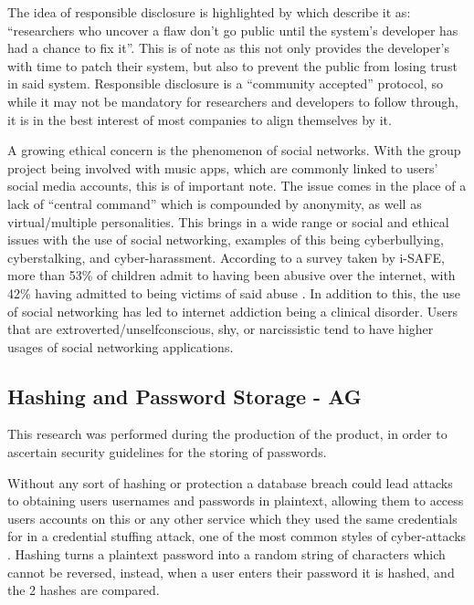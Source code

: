 \documentclass[10pt, notitlepage]{report}
\begin{document}
The idea of responsible disclosure is highlighted by \cite{2010a} which describe it as: “researchers who uncover a flaw don't go public until the system's developer has had a chance to fix it”.  This is of note as this not only provides the developer’s with time to patch their system, but also to prevent the public from losing trust in said system.  Responsible disclosure is a “community accepted” protocol, so while it may not be mandatory for researchers and developers to follow through, it is in the best interest of most companies to align themselves by it.

A growing ethical concern is the phenomenon of social networks.  With the group project being involved with music apps, which are commonly linked to users’ social media accounts, this is of important note.  The issue comes in the place of a lack of “central command” which is compounded by anonymity, as well as virtual/multiple personalities.  This brings in a wide range or social and ethical issues with the use of social networking, examples of this being cyberbullying, cyberstalking, and cyber-harassment.  According to a survey taken by i-SAFE, more than 53\% of children admit to having been abusive over the internet, with 42\% having admitted to being victims of said abuse \cite{iSAFE2004}. In addition to this, the use of social networking has led to internet addiction being a clinical disorder.  Users that are extroverted/unselfconscious, shy, or narcissistic \cite{Kizza2016} tend to have higher usages of social networking applications.  


\subsection{Hashing and Password Storage - AG}
\label{res:passsec}

This research was performed during the production of the product, in order to ascertain security guidelines for the storing of passwords.\newline

Without any sort of hashing or protection a database breach could lead attacks to obtaining users usernames and passwords in plaintext, allowing them to access users accounts on this or any other service which they used the same credentials for in a credential stuffing attack, one of the most common styles of cyber-attacks \cite{OWASP2020}. Hashing turns a plaintext password into a random string of characters which cannot be reversed, instead, when a user enters their password it is hashed, and the 2 hashes are compared.
\end{document}
